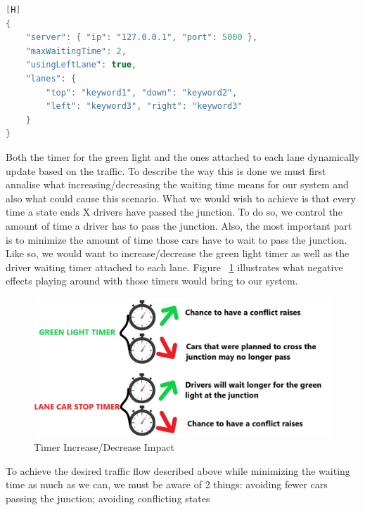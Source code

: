 \documentclass[17pt]{report}
\begin{document}
\begin{lstlisting}[language = C++][H]
{ 
    "server": { "ip": "127.0.0.1", "port": 5000 },
    "maxWaitingTime": 2,
    "usingLeftLane": true,
    "lanes": { 
        "top": "keyword1", "down": "keyword2",
        "left": "keyword3", "right": "keyword3"
    } 
}
\end{lstlisting}

Both the timer for the green light and the ones attached to each lane 
dynamically update based on the traffic. To describe the way this is 
done we must first annalise what increasing/decreasing the waiting time 
means for our system and also what could cause this scenario. 
What we would wish to achieve is that every time a state ends X
drivers have passed the junction. To do so, we control the amount of 
time a driver has to pass the junction. Also, the most important part 
is to minimize the amount of time those cars have to wait to pass the 
junction. Like so, we would want to increase/decrease the green light 
timer as well as the driver waiting timer attached to each lane. 
Figure ~\ref{fig:Timer Increase/Decrease Impact} illustrates
what negative effects playing around with those timers would bring
to our system.

\begin{figure}[h!]
    \includegraphics[width=\textwidth]{Sketches/TimerIncreaseDecreaseImpact.png}
    \caption{Timer Increase/Decrease Impact}
    \label{fig:Timer Increase/Decrease Impact}
\end{figure}

To achieve the desired traffic flow described above while minimizing
the waiting time as much as we can, we must be aware of 2 things:
avoiding fewer cars passing the junction; avoiding conflicting states
\end{document}
